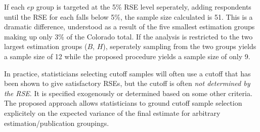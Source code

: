 \documentclass[11pt]{article} %
\begin{document}
If each $ep$ group is targeted at the 5\% RSE level seperately, adding respondents until the RSE for each falls below 5\%, the sample size calculated is 51. This is a dramatic difference, understood as a result of the five smallest estimation groups making up only 3\% of the Colorado total. If the analysis is restricted to the two largest estimation groups ($B$, $H$), seperately sampling from the two groups yields a sample size of 12 while the proposed procedure yields a sample size of only 9. 

In practice, statisticians selecting cutoff samples will often use a cutoff that has been shown to give satisfactory RSEs, but the cutoff is often \emph{not determined by the RSE}. It is specified exogenously or determined based on some other criteria. The proposed approach allows statisticians to ground cutoff sample selection explicitely on the expected variance of the final estimate for arbitrary estimation/publication groupings.


\end{document}
